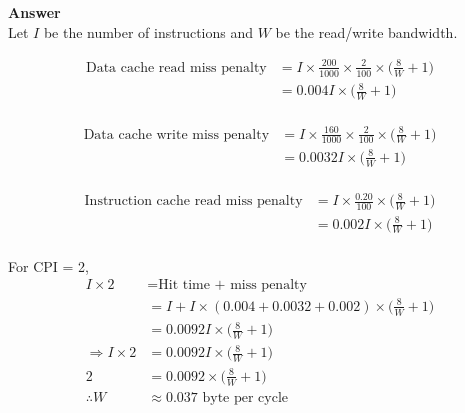 \documentclass[10pt]{extarticle}
\begin{document}
\begin{enumerate}
\begin{enumerate}
            \textbf{Answer} \\ Let $I$ be the number of instructions and $W$ be
            the read/write bandwidth.

            \begin{equation*}
                \begin{split}
                    \text{Data cache read miss penalty} &
                    = I \times \frac{200}{1000} \times \frac{2}{100} \times
                    \bigg(\frac{8}{W} + 1\bigg) \\
                    & = 0.004I \times \bigg(\frac{8}{W} + 1\bigg) \\
                \end{split}
            \end{equation*}

            \begin{equation*}
                \begin{split}
                    \text{Data cache write miss penalty} &
                    = I \times \frac{160}{1000} \times \frac{2}{100} \times
                    \bigg(\frac{8}{W} + 1\bigg) \\
                    & = 0.0032I \times \bigg(\frac{8}{W} + 1\bigg) \\
                \end{split}
            \end{equation*}

            \begin{equation*}
                \begin{split}
                    \text{Instruction cache read miss penalty} &
                    = I \times \frac{0.20}{100} \times \bigg(\frac{8}{W} +
                    1\bigg) \\
                    & = 0.002I \times \bigg(\frac{8}{W} + 1\bigg) \\
                \end{split}
            \end{equation*}

            For CPI = 2,
            \begin{equation*}
                \begin{split}
                    I \times 2 & = \text{Hit time + miss penalty} \\
                    & = I + I \times (0.004 + 0.0032 + 0.002) \times
                    \bigg(\frac{8}{W} + 1\bigg) \\
                    & = 0.0092I \times \bigg(\frac{8}{W} + 1\bigg) \\
                   \Rightarrow I \times 2 & = 0.0092I \times \bigg(\frac{8}{W}
                   + 1\bigg) \\
                   2 & = 0.0092 \times \bigg(\frac{8}{W} + 1\bigg) \\
                   \therefore W & \approx 0.037 \text{ byte per cycle} \\
                \end{split}
            \end{equation*}


\end{enumerate}
\end{enumerate}
\end{document}
